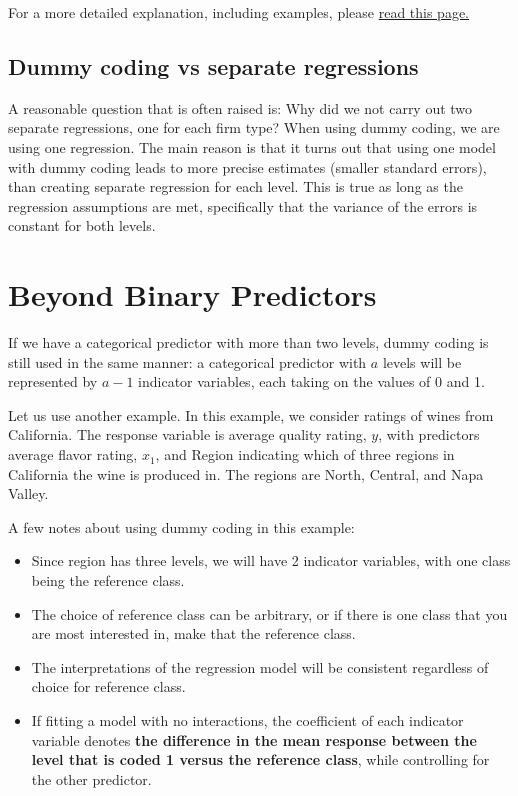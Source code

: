 \documentclass[
]{book}
\providecommand{\tightlist}{%
  \setlength{\itemsep}{0pt}\setlength{\parskip}{0pt}}
\begin{document}
For a more detailed explanation, including examples, please \href{https://www.theanalysisfactor.com/interaction-association}{read this page.}

\hypertarget{dummy-coding-vs-separate-regressions}{%
\subsection{Dummy coding vs separate regressions}\label{dummy-coding-vs-separate-regressions}}

A reasonable question that is often raised is: Why did we not carry out two separate regressions, one for each firm type? When using dummy coding, we are using one regression. The main reason is that it turns out that using one model with dummy coding leads to more precise estimates (smaller standard errors), than creating separate regression for each level. This is true as long as the regression assumptions are met, specifically that the variance of the errors is constant for both levels.

\hypertarget{beyond-binary-predictors}{%
\section{Beyond Binary Predictors}\label{beyond-binary-predictors}}

If we have a categorical predictor with more than two levels, dummy coding is still used in the same manner: a categorical predictor with \(a\) levels will be represented by \(a-1\) indicator variables, each taking on the values of 0 and 1.

Let us use another example. In this example, we consider ratings of wines from California. The response variable is average quality rating, \(y\), with predictors average flavor rating, \(x_1\), and Region indicating which of three regions in California the wine is produced in. The regions are North, Central, and Napa Valley.

A few notes about using dummy coding in this example:

\begin{itemize}
\tightlist
\item
  Since region has three levels, we will have 2 indicator variables, with one class being the reference class.
\item
  The choice of reference class can be arbitrary, or if there is one class that you are most interested in, make that the reference class.
\item
  The interpretations of the regression model will be consistent regardless of choice for reference class.
\item
  If fitting a model with no interactions, the coefficient of each indicator variable denotes \textbf{the difference in the mean response between the level that is coded 1 versus the reference class}, while controlling for the other predictor.
\end{itemize}
\end{document}
